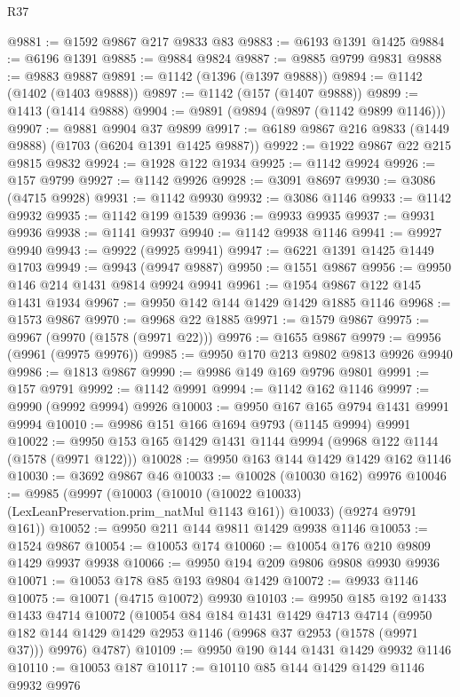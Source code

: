 \begin{lexlean}{R37}
\begin{coremodule}
@9881 := @1592 @9867 @217 @9833 @83
@9883 := @6193 @1391 @1425
@9884 := @6196 @1391
@9885 := @9884 @9824
@9887 := @9885 @9799 @9831
@9888 := @9883 @9887
@9891 := @1142 (@1396 (@1397 @9888))
@9894 := @1142 (@1402 (@1403 @9888))
@9897 := @1142 (@157 (@1407 @9888))
@9899 := @1413 (@1414 @9888)
@9904 := @9891 (@9894 (@9897 (@1142 @9899 @1146)))
@9907 := @9881 @9904 @37 @9899
@9917 := @6189 @9867 @216 @9833 (@1449 @9888) (@1703 (@6204 @1391 @1425 @9887))
@9922 := @1922 @9867 @22 @215 @9815 @9832
@9924 := @1928 @122 @1934
@9925 := @1142 @9924
@9926 := @157 @9799
@9927 := @1142 @9926
@9928 := @3091 @8697
@9930 := @3086 (@4715 @9928)
@9931 := @1142 @9930
@9932 := @3086 @1146
@9933 := @1142 @9932
@9935 := @1142 @199 @1539
@9936 := @9933 @9935
@9937 := @9931 @9936
@9938 := @1141 @9937
@9940 := @1142 @9938 @1146
@9941 := @9927 @9940
@9943 := @9922 (@9925 @9941)
@9947 := @6221 @1391 @1425 @1449 @1703
@9949 := @9943 (@9947 @9887)
@9950 := @1551 @9867
@9956 := @9950 @146 @214 @1431 @9814 @9924 @9941
@9961 := @1954 @9867 @122 @145 @1431 @1934
@9967 := @9950 @142 @144 @1429 @1429 @1885 @1146
@9968 := @1573 @9867
@9970 := @9968 @22 @1885
@9971 := @1579 @9867
@9975 := @9967 (@9970 (@1578 (@9971 @22)))
@9976 := @1655 @9867
@9979 := @9956 (@9961 (@9975 @9976))
@9985 := @9950 @170 @213 @9802 @9813 @9926 @9940
@9986 := @1813 @9867
@9990 := @9986 @149 @169 @9796 @9801
@9991 := @157 @9791
@9992 := @1142 @9991
@9994 := @1142 @162 @1146
@9997 := @9990 (@9992 @9994) @9926
@10003 := @9950 @167 @165 @9794 @1431 @9991 @9994
@10010 := @9986 @151 @166 @1694 @9793 (@1145 @9994) @9991
@10022 := @9950 @153 @165 @1429 @1431 @1144 @9994 (@9968 @122 @1144 (@1578 (@9971 @122)))
@10028 := @9950 @163 @144 @1429 @1429 @162 @1146
@10030 := @3692 @9867 @46
@10033 := @10028 (@10030 @162) @9976
@10046 := @9985
    (@9997
      (@10003 (@10010 (@10022 @10033) (LexLeanPreservation.prim_natMul @1143 @161)) @10033)
      (@9274 @9791 @161))
@10052 := @9950 @211 @144 @9811 @1429 @9938 @1146
@10053 := @1524 @9867
@10054 := @10053 @174
@10060 := @10054 @176 @210 @9809 @1429 @9937 @9938
@10066 := @9950 @194 @209 @9806 @9808 @9930 @9936
@10071 := @10053 @178 @85 @193 @9804 @1429
@10072 := @9933 @1146
@10075 := @10071 (@4715 @10072) @9930
@10103 := @9950
    @185
    @192
    @1433
    @1433
    @4714
    @10072
    (@10054
      @84
      @184
      @1431
      @1429
      @4713
      @4714
      (@9950 @182 @144 @1429 @1429 @2953 @1146 (@9968 @37 @2953 (@1578 (@9971 @37))) @9976)
      @4787)
@10109 := @9950 @190 @144 @1431 @1429 @9932 @1146
@10110 := @10053 @187
@10117 := @10110 @85 @144 @1429 @1429 @1146 @9932 @9976

\end{coremodule}
\end{lexlean}
